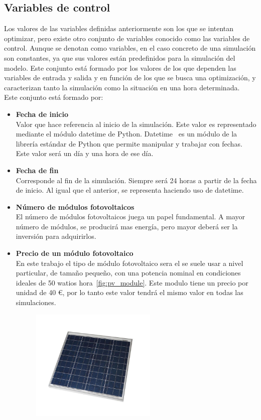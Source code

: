 \subsection{Variables de control}
Los valores de las variables definidas anteriormente son los que se intentan optimizar, pero existe otro conjunto de variables conocido como las variables de control. Aunque se denotan como variables, en el caso concreto de una simulación son constantes, ya que sus valores están predefinidos para la simulación del modelo. Este conjunto está formado por los valores de los que dependen las variables de entrada y salida y en función de los que se busca una optimización, y caracterizan tanto la simulación como la situación en una hora determinada.\\
Este conjunto está formado por:
\begin{itemize}
	\item \textbf{Fecha de inicio}\\ Valor que hace referencia al inicio de la simulación. Este valor es representado mediante el módulo datetime de Python. Datetime~\cite{Dtpy} es un módulo de la librería estándar de Python que permite manipular y trabajar con fechas. Este valor será un día y una hora de ese día.
	\item \textbf{Fecha de fin}\\ Corresponde al fin de la simulación. Siempre será 24 horas a partir de la fecha de inicio. Al igual que el anterior, se representa haciendo uso de datetime.
	\item \textbf{Número de módulos fotovoltaicos}\\ El número de módulos fotovoltaicos juega un papel fundamental. A mayor número de módulos, se producirá mas energía, pero mayor deberá ser la inversión para adquirirlos.
	\item \textbf{Precio de un módulo fotovoltaico}\\ En este trabajo el tipo de módulo fotovoltaico sera el se suele usar a nivel particular, de tamaño pequeño, con una potencia nominal en condiciones ideales de 50 watios hora~\ref{fig:pv_module}. Este modulo tiene un precio por unidad de 40 €, por lo tanto este valor tendrá el mismo valor en todas las simulaciones.
          \begin{figure}[!h]
            \centering
            \includegraphics[width=6cm]{figs/panel_solar.jpg}

\end{figure}
\end{itemize}
